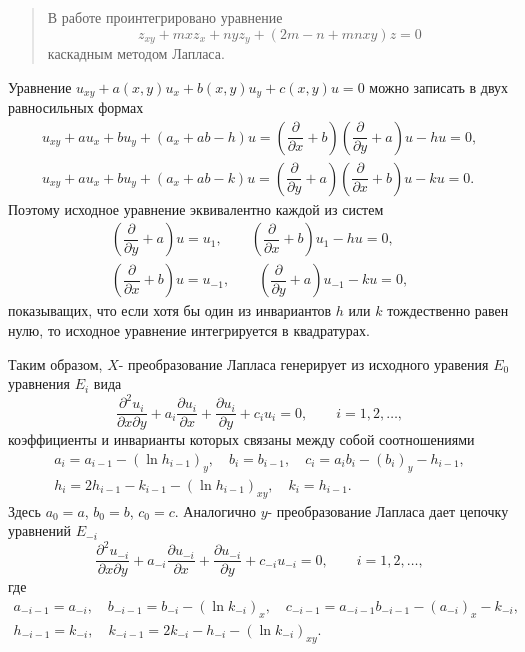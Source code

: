 \begin{abstract}
В работе проинтегрировано уравнение $$z_{xy}+mxz_{x}+nyz_{y}+(2m-n+mnxy)z=0$$ каскадным методом Лапласа.

\end{abstract}




Уравнение $		u_{xy}+a(x, y)u_{x}+b(x, y)u_{y}+c(x, y)u=0$
 можно записать в двух равносильных формах
	$$
		\begin{array}{l}
			u_{xy}+au_{x}+bu_{y}+(a_{x}+ab-h)u=\left( \dfrac{\partial}{\partial x}+b\right) \left(\dfrac{\partial}{\partial y}+a\right)u-hu=0,\\
			u_{xy}+au_{x}+bu_{y}+(a_{x}+ab-k)u=\left(\dfrac{\partial}{\partial y}+a\right)\left(\dfrac{\partial}{\partial x}+b\right)u-ku=0.
		\end{array}
	$$
	Поэтому исходное уравнение  эквивалентно каждой из систем
$$
\begin{array}{l}
		\left(\dfrac{\partial}{\partial y}+a\right)u=u_{1},\qquad \left(\dfrac{\partial}{\partial x}+b\right)u_{1}-hu=0,\\
		\left(\dfrac{\partial}{\partial x}+b\right)u=u_{-1},\qquad \left(\dfrac{\partial}{\partial y}+a\right)u_{-1}-ku=0,
		\end{array}
$$
показыващих, что если хотя бы один из инвариантов $h$ или $k$ тождественно равен нулю, то исходное уравнение интегрируется в квадратурах.

Таким образом, $X$- преобразование Лапласа генерирует из исходного уравения $E_{0}$ уравнения $E_{i}$ вида
$$
	 	\dfrac{\partial^{2}u_{i}}{\partial x\partial y}+a_{i}\dfrac{\partial u_{i}}{\partial x}+\dfrac{\partial u_{i}}{\partial y}+c_{i}u_{i}=0,\qquad i= 1, 2,\ldots,
$$
коэффициенты и инварианты которых связаны между собой соотношениями
$$
	  	\begin{array}{l}
	  		a_{i}=a_{i-1}-(\ln h_{i-1})_{y},\quad b_{i}=b_{i-1},\quad c_{i}=a_{i}b_{i}-(b_{i})_{y}-h_{i-1},\\
	  		h_{i}=2h_{i-1}-k_{i-1}-(\ln h_{i-1})_{xy},\quad 	k_{i}=h_{i-1}.
	  	\end{array}
$$
Здесь $a_{0}=a$, $b_{0}=b$, $c_{0}=c$. Аналогично $y$- преобразование Лапласа дает цепочку уравнений $E_{-i}$
$$
  	 	\dfrac{\partial^{2}u_{-i}}{\partial x\partial y}+a_{-i}\dfrac{\partial u_{-i}}{\partial x}+\dfrac{\partial u_{-i}}{\partial y}+c_{-i}u_{-i}=0,\qquad i= 1, 2,\ldots,
$$
	  где
$$
	  	\begin{array}{l}
	  		a_{-i-1}=a_{-i},\quad b_{-i-1}=b_{-i}-(\ln k_{-i})_{x},\quad c_{-i-1}=a_{-i-1}b_{-i-1}-(a_{-i})_{x}-k_{-i},\\
	  		h_{-i-1}=k_{-i},\quad 	k_{-i-1}=2k_{-i}-h_{-i}-(\ln k_{-i})_{xy}.
	  	\end{array}
$$
	  
